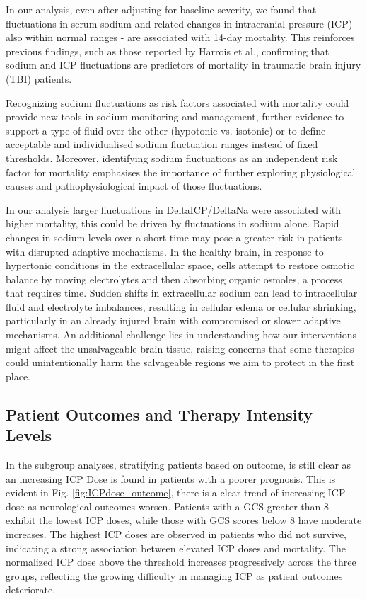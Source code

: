 In our analysis, even after adjusting for baseline severity, we found that fluctuations in serum sodium and related changes in intracranial pressure (ICP) - also within normal ranges - are associated with 14-day mortality. This reinforces previous findings, such as those reported by Harrois et al.\cite{harroisVariabilitySerumSodium2021a}, confirming that sodium and ICP fluctuations are predictors of mortality in traumatic brain injury (TBI) patients.

Recognizing sodium fluctuations as risk factors associated with mortality could provide new tools in sodium monitoring and management, further evidence to support a type of fluid over the other (hypotonic vs. isotonic) or to define acceptable and individualised sodium fluctuation ranges instead of fixed thresholds. Moreover, identifying sodium fluctuations as an independent risk factor for mortality emphasises the importance of further exploring physiological causes and pathophysiological impact of those fluctuations. 

In our analysis larger fluctuations in DeltaICP/DeltaNa were associated with higher mortality, this could be driven by fluctuations in sodium alone. Rapid changes in sodium levels over a short time may pose a greater risk in patients with disrupted adaptive mechanisms. In the healthy brain, in response to hypertonic conditions in the extracellular space, cells attempt to restore osmotic balance by moving electrolytes and then absorbing organic osmoles, a process that requires time. Sudden shifts in extracellular sodium can lead to intracellular fluid and electrolyte imbalances, resulting in cellular edema or cellular shrinking, particularly in an already injured brain with compromised or slower adaptive mechanisms. An additional challenge lies in understanding how our interventions might affect the unsalvageable brain tissue, raising concerns that some therapies could unintentionally harm the salvageable regions we aim to protect in the first place.

\subsection{Patient Outcomes and Therapy Intensity Levels}
In the subgroup analyses, stratifying patients based on outcome, is still clear as an increasing ICP Dose is found in patients with a poorer prognosis. This is evident in Fig. \ref{fig:ICPdose_outcome}, there is a clear trend of increasing ICP dose as neurological outcomes worsen. Patients with a GCS greater than 8 exhibit the lowest ICP doses, while those with GCS scores below 8 have moderate increases. The highest ICP doses are observed in patients who did not survive, indicating a strong association between elevated ICP doses and mortality. The normalized ICP dose above the threshold increases progressively across the three groups, reflecting the growing difficulty in managing ICP as patient outcomes deteriorate.

